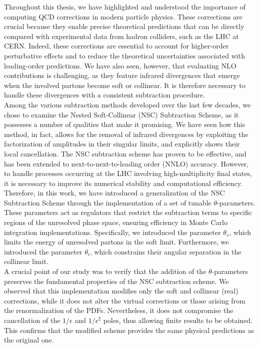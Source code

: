 \documentclass[a4paper, 12pt]{book}
\begin{document}
Throughout this thesis, we have highlighted and understood the importance of computing QCD corrections in modern particle physics. These corrections are crucial because they enable precise theoretical predictions that can be directly compared with experimental data from hadron colliders, such as the LHC at CERN. Indeed, these corrections are essential to account for higher-order perturbative effects and to reduce the theoretical uncertainties associated with leading-order predictions. We have also seen, however, that evaluating NLO contributions is challenging, as they feature infrared divergences that emerge when the involved partons become soft or collinear. It is therefore necessary to handle these divergences with a consistent subtraction procedure. \\
Among the various subtraction methods developed over the last few decades, we chose to examine the Nested Soft-Collinear (NSC) Subtraction Scheme, as it possesses a number of qualities that make it promising. We have seen how this method, in fact, allows for the removal of infrared divergences by exploiting the factorization of amplitudes in their singular limits, and explicitly shows their local cancellation. The NSC subtraction scheme has proven to be effective, and has been extended to next-to-next-to-leading order (NNLO) accuracy. However, to handle processes occurring at the LHC involving high-multiplicity final states, it is necessary to improve its numerical stability and computational efficiency.\\
Therefore, in this work, we have introduced a generalization of the NSC Subtraction Scheme through the implementation of a set of tunable $\theta$-parameters. These parameters act as regulators that restrict the subtraction terms to specific regions of the unresolved phase space, ensuring efficiency in Monte Carlo integration implementations. Specifically, we introduced the parameter $\theta_s$, which limits the energy of unresolved partons in the soft limit. Furthermore, we introduced the parameter $\theta_i$, which constrains their angular separation in the collinear limit.\\
A crucial point of our study was to verify that the addition of the $\theta$-parameters preserves the fundamental properties of the NSC subtraction scheme. We observed that this implementation modifies only the soft and collinear (real) corrections, while it does not alter the virtual corrections or those arising from the renormalization of the PDFs. Nevertheless, it does not compromise the cancellation of the $1/\epsilon$ and $1/\epsilon^2$ poles, thus allowing finite results to be obtained. This confirms that the modified scheme provides the same physical predictions as the original one.\\
\end{document}
